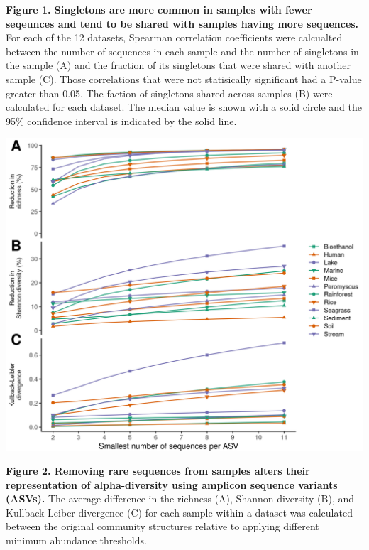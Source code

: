 \documentclass[
]{article}
\begin{document}
\textbf{Figure 1. Singletons are more common in samples with fewer
seqeunces and tend to be shared with samples having more sequences.} For
each of the 12 datasets, Spearman correlation coefficients were
calcualted between the number of sequences in each sample and the number
of singletons in the sample (A) and the fraction of its singletons that
were shared with another sample (C). Those correlations that were not
statisically significant had a P-value greater than 0.05. The faction of
singletons shared across samples (B) were calculated for each dataset.
The median value is shown with a solid circle and the 95\% confidence
interval is indicated by the solid line.

\newpage

\includegraphics{figure_2.png}

\textbf{Figure 2. Removing rare sequences from samples alters their
representation of alpha-diversity using amplicon sequence variants
(ASVs).} The average difference in the richness (A), Shannon diversity
(B), and Kullback-Leiber divergence (C) for each sample within a dataset
was calculated between the original community structures relative to
applying different minimum abundance thresholds.

\newpage
\end{document}
